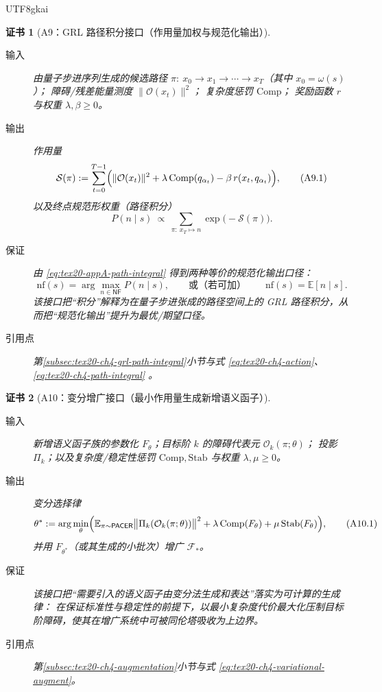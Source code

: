 \documentclass[12pt]{article}
\newtheorem{Certificate}{证书}[section]
\begin{document}
\begin{CJK*}{UTF8}{gkai}
\begin{Certificate}[A9：\textsf{GRL} 路径积分接口（作用量加权与规范化输出）]
\label{cert:tex20-appA-grl-path-integral-interface}
\begin{description}
  \item[输入] 由量子步进序列生成的候选路径
  $\pi:\ x_0\to x_1\to\cdots\to x_T$（其中 $x_0=\omega(s)$）；
  障碍/残差能量测度 $\|\mathcal{O}(x_t)\|^2$；
  复杂度惩罚 $\mathrm{Comp}$；
  奖励函数 $r$ 与权重 $\lambda,\beta\ge 0$。
  \item[输出] 作用量
  \[
  \mathcal{S}(\pi):=\sum_{t=0}^{T-1}\Bigl(\|\mathcal{O}(x_t)\|^2+\lambda\,\mathrm{Comp}(q_{\alpha_t})-\beta\,r(x_t,
    q_{\alpha_t})\Bigr),
  \tag{A9.1}
  \label{eq:tex20-appA-action}
  \]
  以及终点规范形权重（路径积分）
  \[
  P(n\mid s)\ \propto\ \sum_{\pi:\ x_T\mapsto n}\exp\bigl(-\mathcal{S}(\pi)\bigr).
  \tag{A9.2}
  \label{eq:tex20-appA-path-integral}
  \]
  \item[保证] 由 \eqref{eq:tex20-appA-path-integral} 得到两种等价的规范化输出口径：
  \[
  \mathrm{nf}(s)=\arg\max_{n\in\mathsf{NF}}P(n\mid s),
  \qquad\text{或（若可加）}\qquad
  \mathrm{nf}(s)=\mathbb{E}[n\mid s].
  \]
  该接口把“积分”解释为在量子步进张成的路径空间上的 \textsf{GRL} 路径积分，从而把“规范化输出”提升为最优/期望口径。
  \item[引用点] 第\ref{subsec:tex20-ch4-grl-path-integral}小节与式 \eqref{eq:tex20-ch4-action}、\eqref{eq:tex20-ch4-path-integral}
    。
\end{description}
\end{Certificate}

\begin{Certificate}[A10：变分增广接口（最小作用量生成新增语义函子）]
\label{cert:tex20-appA-variational-augmentation-interface}
\begin{description}
  \item[输入] 新增语义函子族的参数化 $F_\theta$；目标阶 $k$ 的障碍代表元 $\mathcal{O}_k(\pi;\theta)$；
  投影 $\Pi_k$；以及复杂度/稳定性惩罚 $\mathrm{Comp},\mathrm{Stab}$ 与权重 $\lambda,\mu\ge 0$。
  \item[输出] 变分选择律
  \[
  \theta^\ast := \arg\min_{\theta}
  \Bigl(
  \mathbb{E}_{\pi\sim \textsf{PACER}}\bigl\|\Pi_k(\mathcal{O}_k(\pi;\theta))\bigr\|^2
  +\lambda\,\mathrm{Comp}(F_\theta)+\mu\,\mathrm{Stab}(F_\theta)
  \Bigr),
  \tag{A10.1}
  \label{eq:tex20-appA-variational-augment}
  \]
  并用 $F_{\theta^\ast}$（或其生成的小批次）增广 $\mathcal{F}_\ast$。
  \item[保证] 该接口把“需要引入的语义函子由变分法生成和表达”落实为可计算的生成律：
  在保证标准性与稳定性的前提下，以最小复杂度代价最大化压制目标阶障碍，使其在增广系统中可被同伦塔吸收为上边界。
  \item[引用点] 第\ref{subsec:tex20-ch4-augmentation}小节与式 \eqref{eq:tex20-ch4-variational-augment}。
\end{description}
\end{Certificate}


\end{CJK*}
\end{document}
